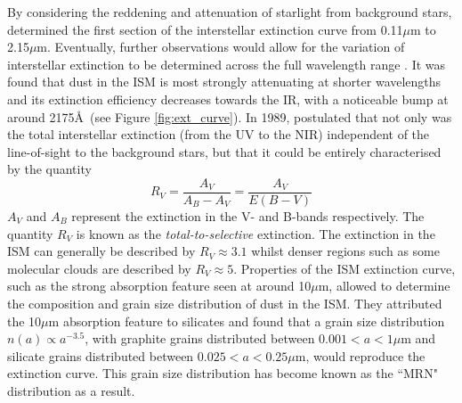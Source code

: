 By considering the reddening and attenuation of starlight from background stars,  \citet{Bless1972} determined the first section of the interstellar extinction curve from 0.11$\mu$m to 2.15$\mu$m.  Eventually, further observations would allow for the variation of interstellar extinction to be determined across the full wavelength range \citep{Rieke1985}.  It was found that dust in the ISM is most strongly attenuating at shorter wavelengths and its extinction efficiency decreases towards the IR, with a noticeable bump at around 2175\AA\ (see Figure \ref{fig:ext_curve}). In 1989, \citeauthor*{Cardelli1989} postulated that not only was the total interstellar extinction (from the UV to the NIR) independent of the line-of-sight to the background stars, but that it could be entirely characterised by the quantity
\begin{equation}
R_V=\frac{A_V}{A_B-A_V}=\frac{A_V}{E(B-V)}
\end{equation}
\noindent $A_V$ and $A_B$ represent the extinction in the V- and B-bands respectively. The quantity $R_V$ is known as the {\em total-to-selective} extinction.  The extinction in the ISM can generally be described by $R_V\approx3.1$ whilst denser regions such as some molecular clouds are described by $R_V\approx5$.  Properties of the ISM extinction curve, such as the strong absorption feature seen at around 10$\mu$m, allowed \citet*{Mathis1977} to determine the composition and grain size distribution of dust in the ISM.  They attributed the 10$\mu$m absorption feature to silicates and found that a grain size distribution $n(a) \propto a^{-3.5}$, with graphite grains distributed between $0.001<a<1\mu$m and silicate grains distributed between $0.025<a<0.25\mu$m, would reproduce the extinction curve.  This grain size distribution has become known as the ``MRN" distribution as a result.  

